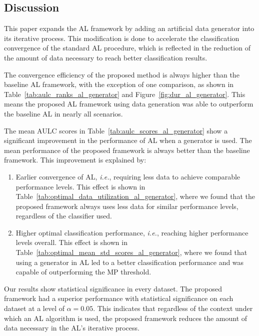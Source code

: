 \subsection{Discussion}

This paper expands the AL framework by adding an artificial data generator
into its iterative process. This modification is done to accelerate the
classification convergence of the standard AL procedure, which is
reflected in the reduction of the amount of data necessary to reach better
classification results.

The convergence efficiency of the proposed method is always higher than the
baseline AL framework, with the exception of one comparison, as shown in
Table~\ref{tab:aulc_ranks_al_generator} and Figure~\ref{fig:dur_al_generator}. This means the proposed
AL framework using data generation was able to outperform the baseline AL in
nearly all scenarios. 

The mean AULC scores in Table~\ref{tab:aulc_scores_al_generator} show a significant
improvement in the performance of AL when a generator is used. The mean
performance of the proposed framework is always better than the
baseline framework. This improvement is explained by:

\begin{enumerate}
    \item Earlier convergence of AL, \textit{i.e.}, requiring less data to
        achieve comparable performance levels. This effect is shown in
        Table~\ref{tab:optimal_data_utilization_al_generator}, where we found that the
        proposed framework always uses less data for similar performance
        levels, regardless of the classifier used.
    \item Higher optimal classification performance, \textit{i.e.}, reaching
        higher performance levels overall. This effect is shown in
        Table~\ref{tab:optimal_mean_std_scores_al_generator}, where we found that using a
        generator in AL led to a better classification performance and was
        capable of outperforming the MP threshold. 
\end{enumerate} 

Our results show statistical significance in every dataset. The proposed
framework had a superior performance with statistical significance on each
dataset at a level of $\alpha = 0.05$. This indicates that regardless of the
context under which an AL algorithm is used, the proposed framework reduces
the amount of data necessary in the AL's iterative process.


